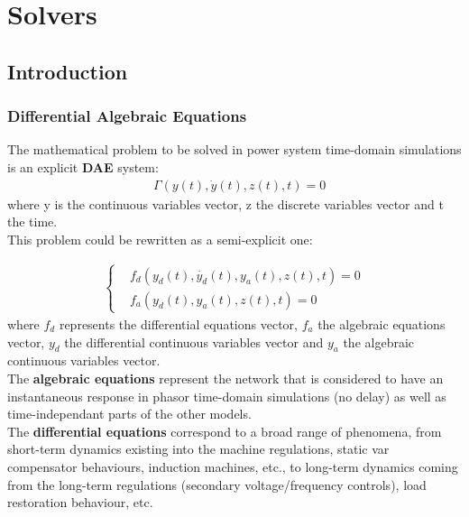 \documentclass[a4paper, 12pt]{report}
\begin{document}
\section{Solvers}

\subsection{Introduction}
\label{sec:Solver Introduction}

\subsubsection{Differential Algebraic Equations}

The mathematical problem to be solved in power system time-domain simulations is an explicit \textbf{\ac{DAE}} system:\\
\begin{equation}
\begin{aligned}
& \Gamma(y(t), \dot{y}(t), z(t), t) = 0
\end{aligned}
\label{DAE}
\end{equation}
where y is the continuous variables vector, z the discrete variables vector and t the time. \\

This problem could be rewritten as a semi-explicit one:

\begin{equation}
\begin{aligned}
\begin{cases}
& f_d(y_d(t), \dot{y_d}(t), y_a(t), z(t), t) = 0 \\
& f_a(y_d(t), y_a(t), z(t), t) = 0
\end{cases}
\end{aligned}
\end{equation}
where $f_d$ represents the differential equations vector, $f_a$ the algebraic equations vector, $y_d$ the differential continuous variables vector and $y_a$ the algebraic continuous variables vector. \\

The \textbf{algebraic equations} represent the network that is considered to have an instantaneous response in phasor time-domain simulations (no delay) as well as time-independant parts of the other models.\\

The \textbf{differential equations} correspond to a broad range of phenomena, from short-term dynamics existing into the machine regulations, static var compensator behaviours, induction machines, etc., to long-term dynamics coming from the long-term regulations (secondary voltage/frequency controls), load restoration behaviour, etc.
\end{document}
